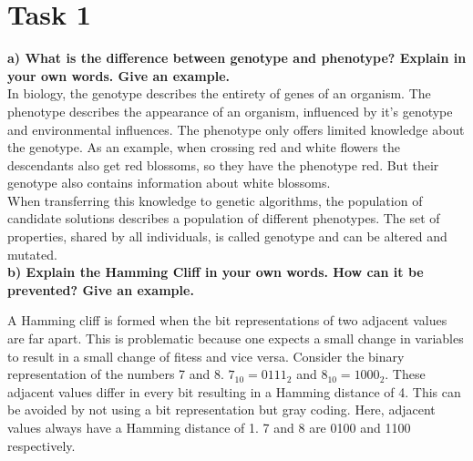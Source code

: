 \documentclass[12pt,letterpaper]{article}
\begin{document}
\section*{Task 1}
\textbf{a) What  is  the  difference  between  genotype  and  phenotype?  Explain  in  your  own  words.  Give  an example.}\\

In biology, the genotype describes the entirety of genes of an organism. The phenotype describes the appearance of an organism, influenced by it's genotype and environmental influences. The phenotype only offers limited knowledge about the genotype. As an example, when crossing red and white flowers the descendants also get red blossoms, so they have the phenotype red. But their genotype also contains information about white blossoms.\\

When transferring this knowledge to genetic algorithms, the population of candidate solutions describes a population of different phenotypes. The set of properties, shared by all individuals, is called genotype and can be altered and mutated.\\

\textbf{b)  Explain the Hamming Cliff in your own words. How can it be prevented? Give an example.}

A Hamming cliff is formed when the bit representations of two adjacent values are far apart. This is problematic because one expects a small change in variables to result in a small change of fitess and vice versa. Consider the binary representation of the numbers 7 and 8. $7_{10} = 0111_{2}$ and $8_{10} = 1000_{2}$. These adjacent values differ in every bit resulting in a Hamming distance of 4. This can be avoided by not using a bit representation but gray coding. Here, adjacent values always have a Hamming distance of 1. 7 and 8 are 0100 and 1100 respectively. 
\end{document}
